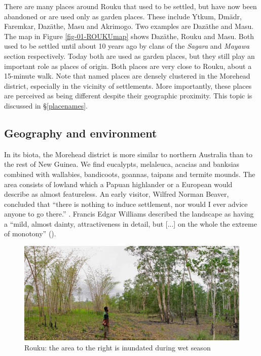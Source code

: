 There are many places around Rouku that used to be settled, but have now been abandoned or are used only as garden places. These include Ytkum, Dmädr, Faremkar, Ŋazäthe, Masu and Akrimogo. Two examples are Ŋazäthe and Masu. The map in Figure \ref{fig-01-ROUKUmap} shows Ŋazäthe, Rouku and Masu. Both used to be settled until about 10 years ago by clans of the \emph{Sagara} and \emph{Mayawa} section respectively. Today both are used as garden places, but they still play an important role as places of origin. Both places are very close to Rouku, about a 15-minute walk. Note that named places are densely clustered in the Morehead district, especially in the vicinity of settlements. More importantly, these places are perceived as being different despite their geographic proximity. This topic is discussed in \S\ref{placenames}.

\subsection{Geography and environment}\label{geographyenviro}

In its biota, the Morehead district is more similar to northern Australia than to the rest of New Guinea. We find eucalypts, melaleuca, acacias and banksias combined with wallabies, bandicoots, goannas, taipans and termite mounds. The area consists of lowland which a Papuan highlander or a European would describe as almost featureless. An early visitor, Wilfred Norman Beaver, concluded that ``there is nothing to induce settlement, nor would I ever advice anyone to go there.'' \citep[64]{Murray1912pap}. Francis Edgar Williams described the landscape as having a ``mild, almost dainty, attractiveness in detail, but [...] on the whole the extreme of monotony'' (\citeyear[1]{Williams:1936transfly}).

\begin{figure}
    \includegraphics[width=.85\textwidth]{figures/landscape1.jpg}
  \caption[The highest water level during wet season]{Rouku: the area to the right is inundated during wet season}
  \label{fig:landscape1}
\end{figure}%

